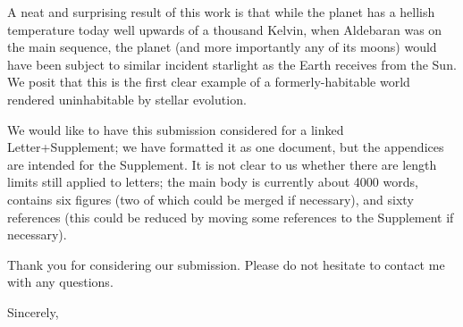 \documentclass{letter}
\begin{document}
\begin{letter}
A neat and surprising result of this work is that while the planet has a hellish
temperature today well upwards of a thousand Kelvin, when Aldebaran was on the
main sequence, the planet (and more importantly any of its moons) would have
been subject to similar incident starlight as the Earth receives from the Sun.
We posit that this is the first clear example of a formerly-habitable world
rendered uninhabitable by stellar evolution.

We would like to have this submission considered for a linked Letter+Supplement;
we have formatted it as one document, but the appendices are intended for the
Supplement.  It is not clear to us whether there are length limits still applied
to letters; the main body is currently about 4000 words, contains six figures
(two of which could be merged if necessary), and sixty references (this could be
reduced by moving some references to the Supplement if necessary).

Thank you for considering our submission. Please do not hesitate to contact me
with any questions. 

\closing{Sincerely,}

\end{letter}
\end{document}
